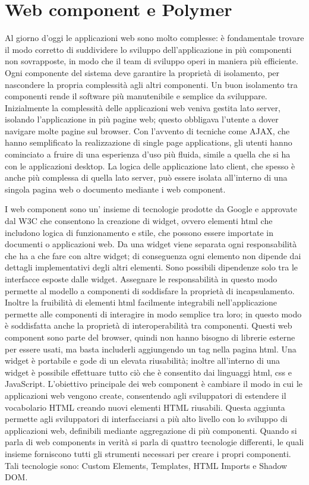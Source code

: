 \section{Web component e Polymer}
\label{sec:chapter_tecnologie_abilitanti_webcomp_poly}

Al giorno d’oggi le applicazioni web sono molto complesse: è fondamentale trovare il modo corretto di suddividere lo sviluppo dell’applicazione in più componenti non sovrapposte, in modo che il team di sviluppo operi in maniera più efficiente. 
Ogni componente del sistema deve garantire la proprietà di isolamento, per nascondere la propria complessità agli altri componenti.
Un buon isolamento tra componenti rende il software più manutenibile e semplice da sviluppare.
Inizialmente la complessità delle applicazioni web veniva gestita lato server, isolando l’applicazione in più pagine web; questo obbligava l’utente a dover navigare molte pagine sul browser.
Con l’avvento di tecniche come AJAX, che hanno semplificato la realizzazione di single page applications, gli utenti hanno cominciato a fruire di una esperienza d’uso più fluida, simile a quella che si ha con le applicazioni desktop. 
La logica delle applicazione lato client, che spesso è anche più complessa di quella lato server, può essere isolata all’interno di una singola pagina web o documento mediante i web component.

I web component sono un’ insieme di tecnologie prodotte da  Google e approvate dal W3C che consentono la creazione di widget, ovvero elementi html che includono logica di funzionamento e stile, che possono essere importate in documenti o applicazioni web. Da una widget viene separata ogni responsabilità che ha a che fare con altre widget; di conseguenza ogni elemento non dipende dai dettagli implementativi degli altri elementi. Sono possibili dipendenze solo tra le interfacce esposte dalle widget. 
Assegnare le responsabilità in questo modo permette al modello a componenti di soddisfare la proprietà di incapsulamento.
Inoltre la fruibilità di elementi html facilmente integrabili nell’applicazione permette alle componenti di interagire in modo semplice tra loro; in questo modo è soddisfatta anche la proprietà di interoperabilità tra componenti.
Questi web component sono parte del browser, quindi non hanno bisogno di librerie esterne per essere usati, ma basta includerli aggiungendo un tag nella pagina html. 
Una widget è portabile e gode di un elevata riusabilità; inoltre all’interno di una widget è possibile effettuare tutto ciò che è consentito dai linguaggi html, css e JavaScript. 
L’obiettivo principale dei web component è cambiare il modo in cui le applicazioni web vengono create, consentendo agli sviluppatori di estendere il vocabolario HTML creando nuovi elementi HTML riusabili. Questa aggiunta permette agli sviluppatori di interfacciarsi a più alto livello con lo sviluppo di applicazioni web, definibili mediante aggregazione di più componenti.
Quando si parla di web components in verità si parla di quattro tecnologie differenti, le quali insieme forniscono tutti gli strumenti necessari per creare i propri componenti.
Tali tecnologie sono: Custom Elements, Templates, HTML Imports e Shadow DOM. 

